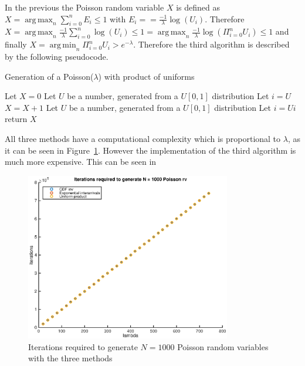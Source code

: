 \documentclass[10pt]{article}
\DeclareMathOperator*{\argmin}{arg\,min}
\DeclareMathOperator*{\argmax}{arg\,max}
\begin{document}
In the previous the Poisson random variable $X$ is defined as $X = \argmax_n{\sum_{i = 0}^n E_i \le 1}$ with $E_i = = \frac{-1}{\lambda} \log(U_i)$. Therefore $X = \argmax_n{\frac{-1}{\lambda} \sum_{i = 0}^n \log(U_i) \le 1} = \argmax_n{\frac{-1}{\lambda} \log( \Pi_{i = 0}^n U_i ) \le 1}$ and finally $X = \argmin_n \Pi_{i = 0}^n U_i > e^{-\lambda}$. Therefore the third algorithm is described by the following pseudocode.

\begin{algorithm}
  \caption{Generation of a Poisson($\lambda$) with product of uniforms}\label{prod}
  \begin{algorithmic}[1]
    \Procedure{}{}
    \State Let $X = 0$
    \State Let $U$ be a number, generated from a $U[0,1]$ distribution
    \State Let $i = U$
    \State $X = X + 1$
    \State Let $U$ be a number, generated from a $U[0,1]$ distribution
    \State Let $i = Ui$
    \EndWhile
    \State return $X$
    \EndProcedure
  \end{algorithmic}
\end{algorithm}

All three methods have a computational complexity which is proportional to $\lambda$, as it can be seen in Figure~\ref{fig:poi_iter}. However the implementation of the third algorithm is much more expensive. This can be seen in

\begin{figure}[h]
  \centering
  \includegraphics[width = 0.8\textwidth]{images/poi_iter}
  \caption{Iterations required to generate $N = 1000$ Poisson random variables with the three methods}
  \label{fig:poi_iter}
\end{figure}
\end{document}
